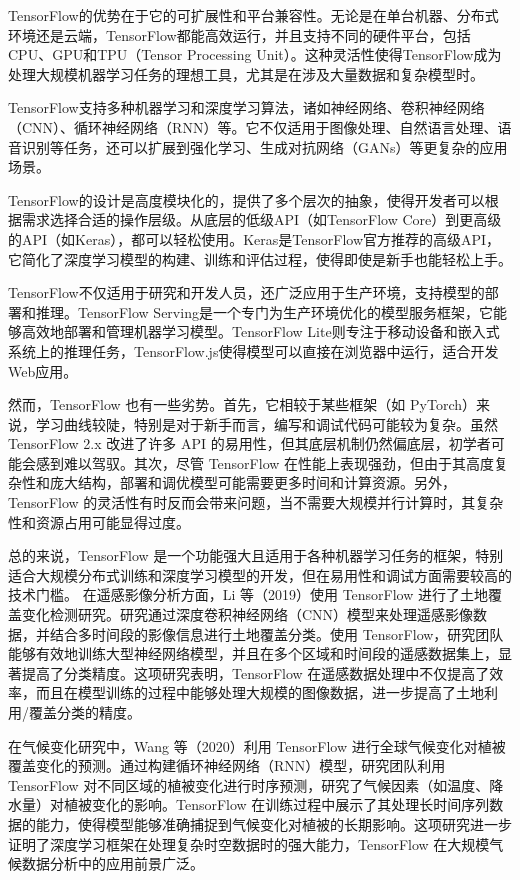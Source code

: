 \documentclass[AutoFakeBold]{LZUThesis-PgD&PhD}
\begin{document}
	TensorFlow的优势在于它的可扩展性和平台兼容性。无论是在单台机器、分布式环境还是云端，TensorFlow都能高效运行，并且支持不同的硬件平台，包括CPU、GPU和TPU（Tensor Processing Unit）。这种灵活性使得TensorFlow成为处理大规模机器学习任务的理想工具，尤其是在涉及大量数据和复杂模型时。
	
	TensorFlow支持多种机器学习和深度学习算法，诸如神经网络、卷积神经网络（CNN）、循环神经网络（RNN）等。它不仅适用于图像处理、自然语言处理、语音识别等任务，还可以扩展到强化学习、生成对抗网络（GANs）等更复杂的应用场景。
	
	TensorFlow的设计是高度模块化的，提供了多个层次的抽象，使得开发者可以根据需求选择合适的操作层级。从底层的低级API（如TensorFlow Core）到更高级的API（如Keras），都可以轻松使用。Keras是TensorFlow官方推荐的高级API，它简化了深度学习模型的构建、训练和评估过程，使得即使是新手也能轻松上手。
	
	TensorFlow不仅适用于研究和开发人员，还广泛应用于生产环境，支持模型的部署和推理。TensorFlow Serving是一个专门为生产环境优化的模型服务框架，它能够高效地部署和管理机器学习模型。TensorFlow Lite则专注于移动设备和嵌入式系统上的推理任务，TensorFlow.js使得模型可以直接在浏览器中运行，适合开发Web应用。
	

	然而，TensorFlow 也有一些劣势。首先，它相较于某些框架（如 PyTorch）来说，学习曲线较陡，特别是对于新手而言，编写和调试代码可能较为复杂。虽然 TensorFlow 2.x 改进了许多 API 的易用性，但其底层机制仍然偏底层，初学者可能会感到难以驾驭。其次，尽管 TensorFlow 在性能上表现强劲，但由于其高度复杂性和庞大结构，部署和调优模型可能需要更多时间和计算资源。另外，TensorFlow 的灵活性有时反而会带来问题，当不需要大规模并行计算时，其复杂性和资源占用可能显得过度。
	
	总的来说，TensorFlow 是一个功能强大且适用于各种机器学习任务的框架，特别适合大规模分布式训练和深度学习模型的开发，但在易用性和调试方面需要较高的技术门槛。
	在遥感影像分析方面，Li 等（2019）使用 TensorFlow 进行了土地覆盖变化检测研究\cite{li2019}。研究通过深度卷积神经网络（CNN）模型来处理遥感影像数据，并结合多时间段的影像信息进行土地覆盖分类。使用 TensorFlow，研究团队能够有效地训练大型神经网络模型，并且在多个区域和时间段的遥感数据集上，显著提高了分类精度。这项研究表明，TensorFlow 在遥感数据处理中不仅提高了效率，而且在模型训练的过程中能够处理大规模的图像数据，进一步提高了土地利用/覆盖分类的精度。
	
	在气候变化研究中，Wang 等（2020）利用 TensorFlow 进行全球气候变化对植被覆盖变化的预测\cite{wang2020H}。通过构建循环神经网络（RNN）模型，研究团队利用 TensorFlow 对不同区域的植被变化进行时序预测，研究了气候因素（如温度、降水量）对植被变化的影响。TensorFlow 在训练过程中展示了其处理长时间序列数据的能力，使得模型能够准确捕捉到气候变化对植被的长期影响。这项研究进一步证明了深度学习框架在处理复杂时空数据时的强大能力，TensorFlow 在大规模气候数据分析中的应用前景广泛。
	
\end{document}
